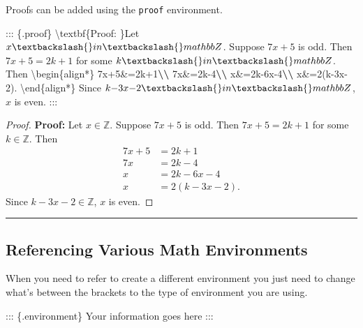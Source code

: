 \documentclass[
]{book}
\newenvironment{Shaded}{\begin{snugshade}}{\end{snugshade}}
\newcommand{\NormalTok}[1]{#1}
\newcommand{\SpecialCharTok}[1]{\textcolor[rgb]{0.81,0.36,0.00}{\textbf{#1}}}
\theoremstyle{definition}
\theoremstyle{definition}
\theoremstyle{definition}
\theoremstyle{definition}
\theoremstyle{remark}
\begin{document}
Proofs can be added using the \texttt{proof} environment.

\begin{Shaded}
\begin{Highlighting}[]
\NormalTok{::: \{.proof\}}
\NormalTok{\textbackslash{}textbf\{Proof: \}Let $x \textbackslash{}in \textbackslash{}mathbb Z$. Suppose $7x+5$ is odd. Then $7x+5=2k+1$ for some $k \textbackslash{}in \textbackslash{}mathbb Z$. Then}
\NormalTok{\textbackslash{}begin\{align*\}}
\NormalTok{    7x+5\&=2k+1}\SpecialCharTok{\textbackslash{}\textbackslash{}}
\NormalTok{    7x\&=2k{-}4}\SpecialCharTok{\textbackslash{}\textbackslash{}}
\NormalTok{    x\&=2k{-}6x{-}4}\SpecialCharTok{\textbackslash{}\textbackslash{}}
\NormalTok{    x\&=2(k{-}3x{-}2).}
\NormalTok{\textbackslash{}end\{align*\}}
\NormalTok{Since $k{-}3x{-}2 \textbackslash{}in \textbackslash{}mathbb Z$, $x$ is even.}
\NormalTok{:::}
\end{Highlighting}
\end{Shaded}

\begin{proof}
\textbf{Proof: }Let \(x \in \mathbb Z\). Suppose \(7x+5\) is odd. Then \(7x+5=2k+1\) for some \(k \in \mathbb Z\). Then
\begin{align*}
    7x+5&=2k+1\\
    7x&=2k-4\\
    x&=2k-6x-4\\
    x&=2(k-3x-2).
\end{align*}
Since \(k-3x-2 \in \mathbb Z\), \(x\) is even.
\end{proof}

\begin{center}\rule{0.5\linewidth}{0.5pt}\end{center}

\subsection{Referencing Various Math Environments}\label{referencing-various-math-environments}

When you need to refer to create a different environment you just need to change what's between the brackets to the type of environment you are using.

\begin{Shaded}
\begin{Highlighting}[]
\NormalTok{::: \{.environment\}}
\NormalTok{Your information goes here}
\NormalTok{:::}
\end{Highlighting}
\end{Shaded}
\end{document}
